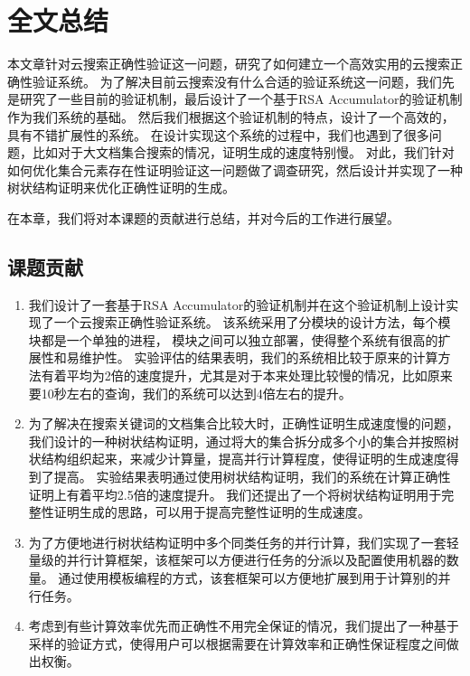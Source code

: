 \chapter{全文总结}
\label{chap:conclusion}

本文章针对云搜索正确性验证这一问题，研究了如何建立一个高效实用的云搜索正确性验证系统。
为了解决目前云搜索没有什么合适的验证系统这一问题，我们先是研究了一些目前的验证机制，最后设计了一个基于RSA Accumulator的验证机制作为我们系统的基础。
然后我们根据这个验证机制的特点，设计了一个高效的，具有不错扩展性的系统。
在设计实现这个系统的过程中，我们也遇到了很多问题，比如对于大文档集合搜索的情况，证明生成的速度特别慢。
对此，我们针对如何优化集合元素存在性证明验证这一问题做了调查研究，然后设计并实现了一种树状结构证明来优化正确性证明的生成。

在本章，我们将对本课题的贡献进行总结，并对今后的工作进行展望。

\section{课题贡献}
\begin{enumerate}
\item 
我们设计了一套基于RSA Accumulator的验证机制并在这个验证机制上设计实现了一个云搜索正确性验证系统。
该系统采用了分模块的设计方法，每个模块都是一个单独的进程，
模块之间可以独立部署，使得整个系统有很高的扩展性和易维护性。
实验评估的结果表明，我们的系统相比较于原来的计算方法有着平均为2倍的速度提升，尤其是对于本来处理比较慢的情况，比如原来要10秒左右的查询，我们的系统可以达到4倍左右的提升。
\item
为了解决在搜索关键词的文档集合比较大时，正确性证明生成速度慢的问题，
我们设计的一种树状结构证明，通过将大的集合拆分成多个小的集合并按照树状结构组织起来，来减少计算量，提高并行计算程度，使得证明的生成速度得到了提高。
实验结果表明通过使用树状结构证明，我们的系统在计算正确性证明上有着平均2.5倍的速度提升。
我们还提出了一个将树状结构证明用于完整性证明生成的思路，可以用于提高完整性证明的生成速度。
\item 
为了方便地进行树状结构证明中多个同类任务的并行计算，我们实现了一套轻量级的并行计算框架，该框架可以方便进行任务的分派以及配置使用机器的数量。
通过使用模板编程的方式，该套框架可以方便地扩展到用于计算别的并行任务。
\item
考虑到有些计算效率优先而正确性不用完全保证的情况，我们提出了一种基于采样的验证方式，使得用户可以根据需要在计算效率和正确性保证程度之间做出权衡。

\end{enumerate}

